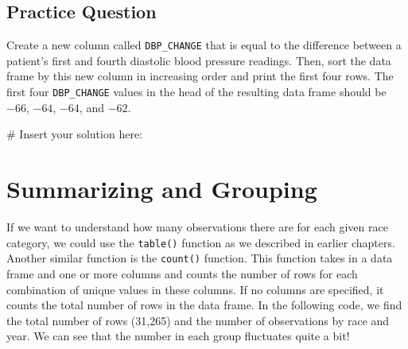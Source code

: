 \documentclass[
  letterpaper,
]{latex/krantz}
\makeatletter
\newenvironment{Shaded}{\begin{snugshade}}{\end{snugshade}}
\newcommand{\CommentTok}[1]{\textcolor[rgb]{0.37,0.37,0.37}{#1}}
\newenvironment{kframe}{%
\medskip{}
\setlength{\fboxsep}{.8em}
 \def\at@end@of@kframe{}%
 \ifinner\ifhmode%
  \def\at@end@of@kframe{\end{minipage}}%
  \begin{minipage}{\columnwidth}%
 \fi\fi%
 \def\FrameCommand##1{\hskip\@totalleftmargin \hskip-\fboxsep
 \colorbox{shadecolor}{##1}\hskip-\fboxsep
     \hskip-\linewidth \hskip-\@totalleftmargin \hskip\columnwidth}%
 \MakeFramed {\advance\hsize-\width
   \@totalleftmargin\z@ \linewidth\hsize
   \@setminipage}}%
 {\par\unskip\endMakeFramed%
 \at@end@of@kframe}
\renewenvironment{Shaded}{\begin{kframe}}{\end{kframe}}
\makeatother
\begin{document}
\subsection{Practice Question}\label{practice-question-9}

Create a new column called \texttt{DBP\_CHANGE} that is equal to the
difference between a patient's first and fourth diastolic blood pressure
readings. Then, sort the data frame by this new column in increasing
order and print the first four rows. The first four \texttt{DBP\_CHANGE}
values in the head of the resulting data frame should be \(-66\),
\(-64\), \(-64\), and \(-62\).

\begin{Shaded}
\begin{Highlighting}[]
\CommentTok{\# Insert your solution here:                    }
\end{Highlighting}
\end{Shaded}

\section{\texorpdfstring{Summarizing and Grouping 
}{Summarizing and Grouping  }}\label{summarizing-and-grouping}

If we want to understand how many observations there are for each given
race category, we could use the \texttt{table()} function as we
described in earlier chapters. Another similar function is the
\texttt{count()} function.
This function takes in a data frame and one or more columns and counts
the number of rows for each combination of unique values in these
columns. If no columns are specified, it counts the total number of rows
in the data frame. In the following code, we find the total number of
rows (31,265) and the number of observations by race and year. We can
see that the number in each group fluctuates quite a bit!
\end{document}
